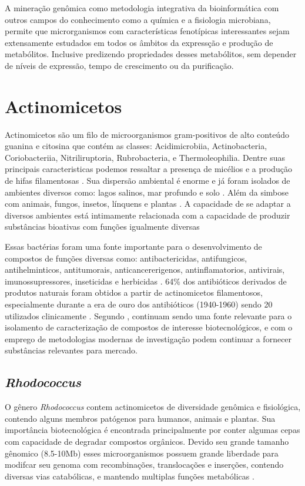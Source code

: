 A mineração genômica como metodologia integrativa da bioinformática com outros campos
do conhecimento como a química e a fisiologia microbiana, permite que microrganismos com características
fenotípicas interessantes sejam extensamente estudados em todos os âmbitos da expressção e produção
de metabólitos. Inclusive predizendo propriedades desses metabólitos, sem depender de níveis de expressão,
tempo de crescimento ou da purificação. \cite{bauman2021genome, baltz2021genome}

\section{Actinomicetos}

Actinomicetos são um filo de microorganismos gram-positivos de alto conteúdo
guanina e citosina que contém as classes: Acidimicrobiia, Actinobacteria, 
Coriobacteriia, Nitriliruptoria, Rubrobacteria, e Thermoleophilia\cite{yadav2018}.
Dentre suas principais caracteristicas podemos ressaltar a presença de micélios
e a produção de hifas filamentosas \cite{chater2016}. Sua dispersão ambiental é enorme
e já foram isolados de ambientes diversos como: lagos salinos, mar profundo e solo \cite{flores2021,felicio2021,sapkota2020}.
Além da simbose com animais, fungos, insetos, línquens e plantas \cite{hei2021,van2017}.
A capacidade de se adaptar a diversos ambientes está intimamente relacionada com a capacidade
de produzir substâncias bioativas com funções igualmente diversas  \cite{van2020}

Essas bactérias foram uma fonte importante para o desenvolvimento de compostos de funções
diversas como: antibactericidas, antifungicos, antihelminticos, antitumorais, anticancererigenos,
antinflamatorios, antivirais, imunossupressores, inseticidas e herbicidas \cite{demain2009,jose2021}. 
64\% dos antibióticos derivados de produtos naturais foram obtidos a partir de actinomicetos filamentosos,
especialmente durante a era de ouro dos antibióticos (1940-1960) sendo 20 utilizados clinicamente \cite{hutchings2019} .
Segundo , continuam sendo uma fonte relevante
para o isolamento de caracterização de compostos de interesse biotecnológicos, e com o
emprego de metodologias modernas de investigação podem continuar a fornecer
substâncias relevantes para mercado. 


\subsection{\textit{Rhodococcus}}
O gênero \textit{Rhodococcus} contem actinomicetos de diversidade genômica e fisiológica,
contendo alguns membros patógenos para humanos, animais e plantas. Sua importância biotecnológica
é encontrada principalmente por conter algumas cepas com capacidade de degradar compostos orgânicos.
Devido seu grande tamanho gênomico (8.5-10Mb) esses microorganismos possuem grande liberdade
para modifcar seu genoma com recombinações, translocações e inserções, contendo diversas vias catabólicas,
e mantendo multiplas funções metabólicas \cite{cappelletti2019}.

